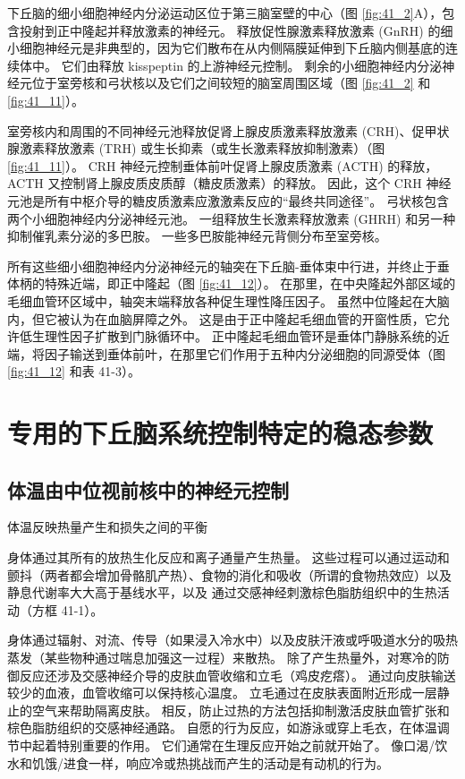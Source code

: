 下丘脑的细小细胞神经内分泌运动区位于第三脑室壁的中心（图 \ref{fig:41_2}A），包含投射到正中隆起并释放激素的神经元。 释放促性腺激素释放激素 (GnRH) 的细小细胞神经元是非典型的，因为它们散布在从内侧隔膜延伸到下丘脑内侧基底的连续体中。 它们由释放 kisspeptin 的上游神经元控制。 剩余的小细胞神经内分泌神经元位于室旁核和弓状核以及它们之间较短的脑室周围区域（图 \ref{fig:41_2} 和 \ref{fig:41_11}）。

室旁核内和周围的不同神经元池释放促肾上腺皮质激素释放激素 (CRH)、促甲状腺激素释放激素 (TRH) 或生长抑素（或生长激素释放抑制激素）（图 \ref{fig:41_11}）。 CRH 神经元控制垂体前叶促肾上腺皮质激素 (ACTH) 的释放，ACTH 又控制肾上腺皮质皮质醇（糖皮质激素）的释放。 因此，这个 CRH 神经元池是所有中枢介导的糖皮质激素应激激素反应的“最终共同途径”。 弓状核包含两个小细胞神经内分泌神经元池。 一组释放生长激素释放激素 (GHRH) 和另一种抑制催乳素分泌的多巴胺。 一些多巴胺能神经元背侧分布至室旁核。

所有这些细小细胞神经内分泌神经元的轴突在下丘脑-垂体束中行进，并终止于垂体柄的特殊近端，即正中隆起（图 \ref{fig:41_12}）。 在那里，在中央隆起外部区域的毛细血管环区域中，轴突末端释放各种促生理性降压因子。 虽然中位隆起在大脑内，但它被认为在血脑屏障之外。 这是由于正中隆起毛细血管的开窗性质，它允许低生理性因子扩散到门脉循环中。 正中隆起毛细血管环是垂体门静脉系统的近端，将因子输送到垂体前叶，在那里它们作用于五种内分泌细胞的同源受体（图 \ref{fig:41_12} 和表 41-3）。

\section{专用的下丘脑系统控制特定的稳态参数}
\subsection{体温由中位视前核中的神经元控制}
体温反映热量产生和损失之间的平衡

身体通过其所有的放热生化反应和离子通量产生热量。 这些过程可以通过运动和颤抖（两者都会增加骨骼肌产热）、食物的消化和吸收（所谓的食物热效应）以及静息代谢率大大高于基线水平，以及 通过交感神经刺激棕色脂肪组织中的生热活动（方框 41-1）。

身体通过辐射、对流、传导（如果浸入冷水中）以及皮肤汗液或呼吸道水分的吸热蒸发（某些物种通过喘息加强这一过程）来散热。 除了产生热量外，对寒冷的防御反应还涉及交感神经介导的皮肤血管收缩和立毛（鸡皮疙瘩）。 通过向皮肤输送较少的血液，血管收缩可以保持核心温度。 立毛通过在皮肤表面附近形成一层静止的空气来帮助隔离皮肤。 相反，防止过热的方法包括抑制激活皮肤血管扩张和棕色脂肪组织的交感神经通路。 自愿的行为反应，如游泳或穿上毛衣，在体温调节中起着特别重要的作用。 它们通常在生理反应开始之前就开始了。 像口渴/饮水和饥饿/进食一样，响应冷或热挑战而产生的活动是有动机的行为。

